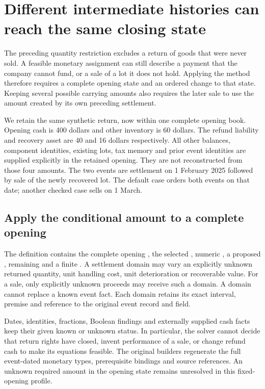 \section{Different intermediate histories can reach the same closing state}
\label{sec:native-conditional-sequence}

The preceding quantity restriction excludes a return of goods that were never
sold. A feasible monetary assignment can still describe a payment that the
company cannot fund, or a sale of a lot it does not hold. Applying the method
therefore requires a complete opening state and an ordered change to that
state. Keeping several possible carrying amounts also requires the later sale
to use the amount created by its own preceding settlement.

We retain the same synthetic return, now within one complete opening book.
Opening cash is 400 dollars and other inventory is 60 dollars. The refund
liability and recovery asset are 40 and 16 dollars respectively. All other
balances, component identities, existing lots, tax memory and prior event
identities are supplied explicitly in the retained opening. They are not
reconstructed from those four amounts. The two events are settlement on
1 February 2025 followed by sale of the newly recovered lot. The default case
orders both events on that date; another checked case sells on 1 March.

\subsection{Apply the conditional amount to a complete opening}

The  definition contains the complete
opening , the selected , numeric ,
a proposed , remaining  and a finite
. A settlement domain may vary an explicitly unknown
returned quantity, unit handling cost, unit deterioration or recoverable value.
For a sale, only explicitly unknown proceeds may receive such a domain.
A domain cannot replace a known event fact. Each domain retains its exact
interval, premise and reference to the original event record and field.

Dates, identities, fractions, Boolean findings and externally supplied cash
facts keep their given known or unknown status. In particular, the solver
cannot decide that return rights have closed, invent performance of a sale,
or change refund cash to make its equations feasible. The original builders
regenerate the full event-dated monetary types, prerequisite bindings and
source references. An unknown required amount in the opening state remains
unresolved in this fixed-opening profile.

